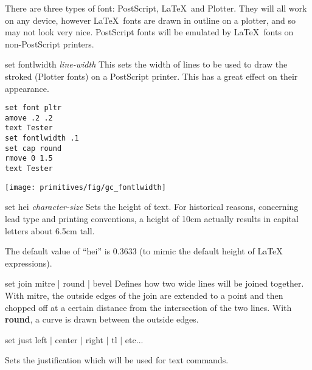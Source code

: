 \begin{commanddescription}
There are three types of font: PostScript, \LaTeX \ and
Plotter.  They will all work on any device, however \LaTeX \ fonts are
drawn in outline on a plotter, and so may not look very nice.
PostScript fonts will be emulated by \LaTeX \ fonts on non-PostScript
printers.

\item[{\sf set fontlwidth {\it line-width}}]
  
This sets the width of lines to be used to draw the stroked (Plotter fonts)
on a PostScript printer.  This has a great effect on their appearance.

\begin{minipage}[c]{8cm}
\begin{Verbatim}
set font pltr
amove .2 .2 
text Tester
set fontlwidth .1 
set cap round
rmove 0 1.5
text Tester
\end{Verbatim}
\end{minipage}
\hfill
\begin{minipage}[c]{7cm}
\mbox{\texttt{[image: primitives/fig/gc\_fontlwidth]}}
\end{minipage}

\item[{\sf set hei {\it character-size}}]
\label{shei:cmd}
Sets the height of text.  For historical reasons, concerning lead type and printing conventions, a height of 10cm actually results in capital letters about 6.5cm tall.

The default value of ``hei'' is 0.3633 (to mimic the default height of \LaTeX{} expressions).

\item[{\sf set join {\sf mitre | round | bevel }}]
Defines how two wide lines will be joined together. With {\sf mitre}, the
outside edges of the join are extended to a point and then chopped
off at a certain distance from the intersection of the two lines.
With {\bf round}, a curve is drawn between the outside edges.


\item[{\sf set just left $|$ center $|$ right  $|$ tl $|$ etc...} ]
\label{sjust:cmd}

Sets the justification which will be used for {\sf text} commands.


\end{commanddescription}
